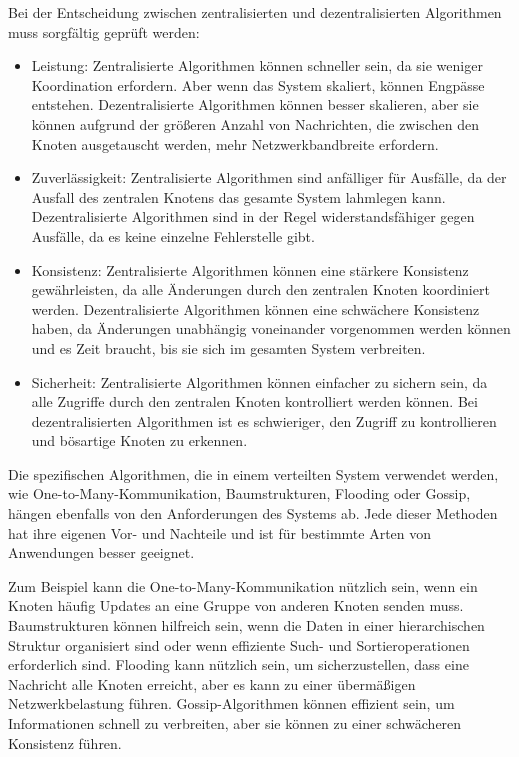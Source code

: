 Bei der Entscheidung zwischen zentralisierten und dezentralisierten Algorithmen muss sorgfältig geprüft werden:
\begin{itemize}
\item Leistung: Zentralisierte Algorithmen können schneller sein, da sie weniger Koordination erfordern. Aber wenn das System skaliert, können Engpässe entstehen. Dezentralisierte Algorithmen können besser skalieren, aber sie können aufgrund der größeren Anzahl von Nachrichten, die zwischen den Knoten ausgetauscht werden, mehr Netzwerkbandbreite erfordern.
\item Zuverlässigkeit: Zentralisierte Algorithmen sind anfälliger für Ausfälle, da der Ausfall des zentralen Knotens das gesamte System lahmlegen kann. Dezentralisierte Algorithmen sind in der Regel widerstandsfähiger gegen Ausfälle, da es keine einzelne Fehlerstelle gibt.
\item Konsistenz: Zentralisierte Algorithmen können eine stärkere Konsistenz gewährleisten, da alle Änderungen durch den zentralen Knoten koordiniert werden. Dezentralisierte Algorithmen können eine schwächere Konsistenz haben, da Änderungen unabhängig voneinander vorgenommen werden können und es Zeit braucht, bis sie sich im gesamten System verbreiten.
\item Sicherheit: Zentralisierte Algorithmen können einfacher zu sichern sein, da alle Zugriffe durch den zentralen Knoten kontrolliert werden können. Bei dezentralisierten Algorithmen ist es schwieriger, den Zugriff zu kontrollieren und bösartige Knoten zu erkennen.
\end{itemize}
Die spezifischen Algorithmen, die in einem verteilten System verwendet werden, wie One-to-Many-Kommunikation, Baumstrukturen, Flooding oder Gossip, hängen ebenfalls von den Anforderungen des Systems ab. Jede dieser Methoden hat ihre eigenen Vor- und Nachteile und ist für bestimmte Arten von Anwendungen besser geeignet.

Zum Beispiel kann die One-to-Many-Kommunikation nützlich sein, wenn ein Knoten häufig Updates an eine Gruppe von anderen Knoten senden muss. Baumstrukturen können hilfreich sein, wenn die Daten in einer hierarchischen Struktur organisiert sind oder wenn effiziente Such- und Sortieroperationen erforderlich sind. Flooding kann nützlich sein, um sicherzustellen, dass eine Nachricht alle Knoten erreicht, aber es kann zu einer übermäßigen Netzwerkbelastung führen. Gossip-Algorithmen können effizient sein, um Informationen schnell zu verbreiten, aber sie können zu einer schwächeren Konsistenz führen.


